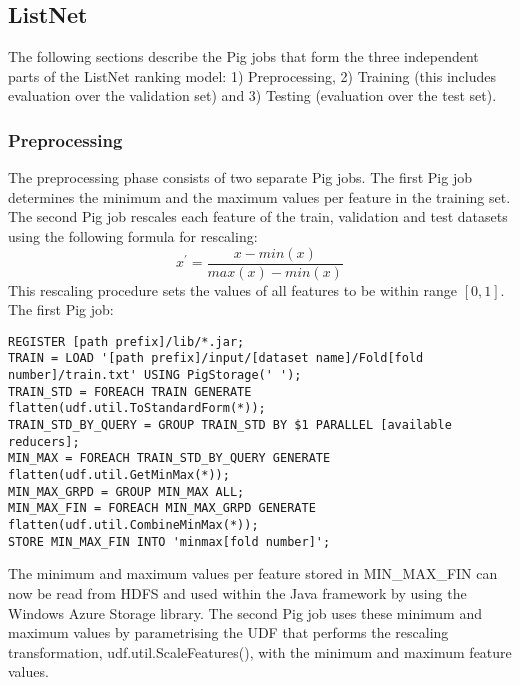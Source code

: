 \subsection{ListNet}
The following sections describe the Pig jobs that form the three independent parts of the ListNet ranking model: 1) Preprocessing, 2) Training (this includes evaluation over the validation set) and 3) Testing (evaluation over the test set). 
\subsubsection{Preprocessing}
The preprocessing phase consists of two separate Pig jobs. The first Pig job determines the minimum and the maximum values per feature in the training set. The second Pig job rescales each feature of the train, validation and test datasets using the following formula for rescaling:
\begin{equation}
x^{'} = \frac{x-min(x)}{max(x)-min(x)}
\end{equation}
This rescaling procedure sets the values of all features to be within range $[0,1]$.\\

The first Pig job:\\
\begin{minipage}{\linewidth}
\begin{lstlisting}
REGISTER [path prefix]/lib/*.jar;
TRAIN = LOAD '[path prefix]/input/[dataset name]/Fold[fold number]/train.txt' USING PigStorage(' ');
TRAIN_STD = FOREACH TRAIN GENERATE flatten(udf.util.ToStandardForm(*));
TRAIN_STD_BY_QUERY = GROUP TRAIN_STD BY $1 PARALLEL [available reducers];
MIN_MAX = FOREACH TRAIN_STD_BY_QUERY GENERATE flatten(udf.util.GetMinMax(*));
MIN_MAX_GRPD = GROUP MIN_MAX ALL;
MIN_MAX_FIN = FOREACH MIN_MAX_GRPD GENERATE flatten(udf.util.CombineMinMax(*));
STORE MIN_MAX_FIN INTO 'minmax[fold number]';
\end{lstlisting}
\end{minipage}

The minimum and maximum values per feature stored in MIN\_MAX\_FIN can now be read from \ac{HDFS} and used within the Java framework by using the Windows Azure Storage library. The second Pig job uses these minimum and maximum values by parametrising the \ac{UDF} that performs the rescaling transformation, udf.util.ScaleFeatures(), with the minimum and maximum feature values.\\

